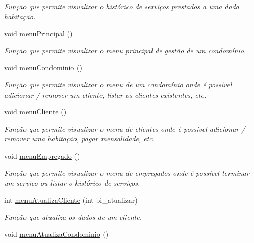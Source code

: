 \begin{DoxyCompactItemize}
\begin{DoxyCompactList}\small\item\em Função que permite visualizar o histórico de serviços prestados a uma dada habitação. \end{DoxyCompactList}\item 
void \hyperlink{class_interface_a417dd813f30bf427f6dd1fe57887a685}{menu\+Principal} ()\hypertarget{class_interface_a417dd813f30bf427f6dd1fe57887a685}{}\label{class_interface_a417dd813f30bf427f6dd1fe57887a685}

\begin{DoxyCompactList}\small\item\em Função que permite visualizar o menu principal de gestão de um condomínio. \end{DoxyCompactList}\item 
void \hyperlink{class_interface_a29d77218d33dab2c23a6c064b5f699db}{menu\+Condominio} ()\hypertarget{class_interface_a29d77218d33dab2c23a6c064b5f699db}{}\label{class_interface_a29d77218d33dab2c23a6c064b5f699db}

\begin{DoxyCompactList}\small\item\em Função que permite visualizar o menu de um condomínio onde é possível adicionar / remover um cliente, listar os clientes existentes, etc. \end{DoxyCompactList}\item 
void \hyperlink{class_interface_a9df9a75b68cd5009f39ff1ae9683d371}{menu\+Cliente} ()\hypertarget{class_interface_a9df9a75b68cd5009f39ff1ae9683d371}{}\label{class_interface_a9df9a75b68cd5009f39ff1ae9683d371}

\begin{DoxyCompactList}\small\item\em Função que permite visualizar o menu de clientes onde é possível adicionar / remover uma habitação, pagar mensalidade, etc. \end{DoxyCompactList}\item 
void \hyperlink{class_interface_a6921af8d7a2a51836bec16fd5f892db3}{menu\+Empregado} ()\hypertarget{class_interface_a6921af8d7a2a51836bec16fd5f892db3}{}\label{class_interface_a6921af8d7a2a51836bec16fd5f892db3}

\begin{DoxyCompactList}\small\item\em Função que permite visualizar o menu de empregados onde é possível terminar um serviço ou listar o histórico de serviços. \end{DoxyCompactList}\item 
int \hyperlink{class_interface_aec1bf503838bf4e4b2b956a5316ff803}{menu\+Atualiza\+Cliente} (int bi\+\_\+atualizar)
\begin{DoxyCompactList}\small\item\em Função que atualiza os dados de um cliente. \end{DoxyCompactList}\item 
void \hyperlink{class_interface_a377af5a888cc9ad6e70184ff505117ba}{menu\+Atualiza\+Condominio} ()\hypertarget{class_interface_a377af5a888cc9ad6e70184ff505117ba}{}\label{class_interface_a377af5a888cc9ad6e70184ff505117ba}


\end{DoxyCompactItemize}
